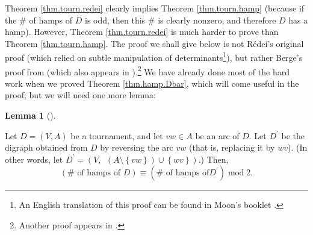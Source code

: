 \documentclass[numbers=enddot,12pt,final,onecolumn,notitlepage]{scrartcl}%
\numberwithin{exer}{subsection}
\theoremstyle{definition}
\newtheorem{lem}[theo]{Lemma}
\newenvironment{lemma}[1][]
{\begin{lem}[#1]\begin{leftbar}}
{\end{leftbar}\end{lem}}
\begin{document}
Theorem \ref{thm.tourn.redei} clearly implies Theorem \ref{thm.tourn.hamp}
(because if the $\#$ of hamps of $D$ is odd, then this $\#$ is clearly
nonzero, and therefore $D$ has a hamp). However, Theorem \ref{thm.tourn.redei}
is much harder to prove than Theorem \ref{thm.tourn.hamp}. The proof we shall
give below is not R\'{e}dei's original proof (which relied on subtle
manipulation of determinants\footnote{An English translation of this proof can
be found in Moon's booklet \cite[proof of Theorem 14]{Moon13}.}), but rather
Berge's proof from \cite[\S 10.2, Theorem 6]{Berge91} (which also appears in
\cite[solution to problem 7.8]{Tomesc85}).\footnote{Another proof appears in
\cite[Corollaire 5.1]{Lass02}.} We have already done most of the hard work
when we proved Theorem \ref{thm.hamp.Dbar}, which will come useful in the
proof; but we will need one more lemma:

\begin{lemma}
\label{lem.tourn.reverse}Let $D=\left(  V,A\right)  $ be a tournament, and let
$vw\in A$ be an arc of $D$. Let $D^{\prime}$ be the digraph obtained from $D$
by reversing the arc $vw$ (that is, replacing it by $wv$). (In other words,
let $D^{\prime}=\left(  V,\ \ \left(  A\setminus\left\{  vw\right\}  \right)
\cup\left\{  wv\right\}  \right)  $.) Then,%
\[
\left(  \#\text{ of hamps of }D\right)  \equiv\left(  \#\text{ of hamps of
}D^{\prime}\right)  \operatorname{mod}2.
\]

\end{lemma}
\end{document}
